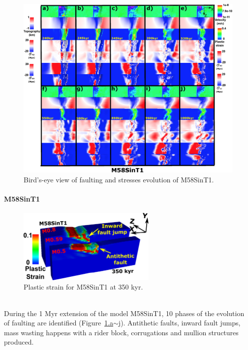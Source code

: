 \begin{figure}[h]
 \centering
  \includegraphics[width=1.0\textwidth]{./Figures/fig_Results_Weakening_5_M58SinT1_time_evolution.eps}
 \caption{Bird's-eye view of faulting and stresses evolution of M58SinT1.}
\label{fig_Results_Weakenging_5}
\end{figure}

\paragraph{M58SinT1}\label{para_M58SinT1}

\begin{figure}[h]
 \centering
  \includegraphics[width=0.6\textwidth]{./Figures/fig_Results_3_4_2_3D_Antithetic_fault.eps}
 \caption{Plastic strain for M58SinT1 at 350 kyr.}
\label{fig_Results_3_4_2_3D_Antithetic_fault}
\end{figure}

~\\
During the 1 Myr extension of the model M58SinT1, 10 phases of the evolution of faulting are identified (Figure~\hyperref[fig_Results_Weakenging_5]{\ref{fig_Results_Weakenging_5}.a$\sim$j}). Antithetic faults, inward fault jumps, mass wasting happens with a rider block, corrugations and mullion structures produced.

